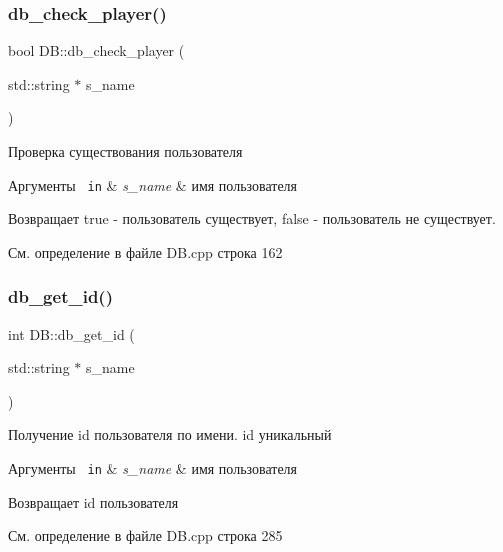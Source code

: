 \subsubsection{\texorpdfstring{db\_check\_player()}{db\_check\_player()}}
{\footnotesize\ttfamily bool D\+B\+::db\+\_\+check\+\_\+player (\begin{DoxyParamCaption}\item[{std\+::string $\ast$}]{s\+\_\+name }\end{DoxyParamCaption})}



Проверка существования пользователя 


\begin{DoxyParams}[1]{Аргументы}
\mbox{\texttt{ in}}  & {\em s\+\_\+name} & имя пользователя \\
\hline
\end{DoxyParams}
\begin{DoxyReturn}{Возвращает}
true -\/ пользователь существует, false -\/ пользователь не существует. 
\end{DoxyReturn}


См. определение в файле D\+B.\+cpp строка 162

\mbox{\label{group__dbcpp_gaa8cdb5ec4f2f269d13cff52b9e47c4cb}} 
\subsubsection{\texorpdfstring{db\_get\_id()}{db\_get\_id()}}
{\footnotesize\ttfamily int D\+B\+::db\+\_\+get\+\_\+id (\begin{DoxyParamCaption}\item[{std\+::string $\ast$}]{s\+\_\+name }\end{DoxyParamCaption})}



Получение id пользователя по имени. id уникальный 


\begin{DoxyParams}[1]{Аргументы}
\mbox{\texttt{ in}}  & {\em s\+\_\+name} & имя пользователя \\
\hline
\end{DoxyParams}
\begin{DoxyReturn}{Возвращает}
id пользователя 
\end{DoxyReturn}


См. определение в файле D\+B.\+cpp строка 285

